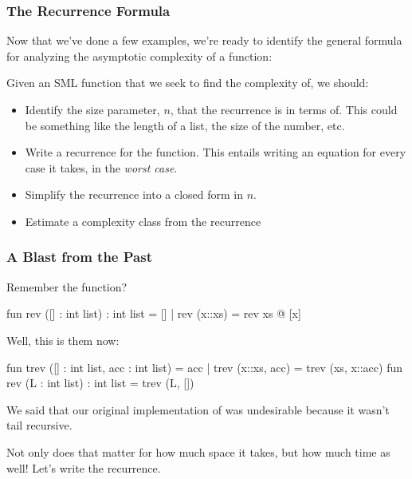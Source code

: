 \documentclass[aspectratio=169, handout]{beamer}
\begin{document}
\begin{frame}[fragile]
  \frametitle{The Recurrence Formula}

  Now that we've done a few examples, we're ready to identify the general formula for 
  analyzing the asymptotic complexity of a function:

  \pause
  \vspace{\fill}

  Given an SML function  that we seek to find the complexity of, we should:

  \pause
  \begin{itemize}
    \item Identify the size parameter, $n$, that the recurrence is in terms of. This could be something like
    the length of a list, the size of the number, etc. \pause
    \item Write a recurrence for the function. This entails writing an equation for every case it takes, in the
    \textit{worst case}. \pause 
    \item Simplify the recurrence into a closed form in $n$. \pause 
    \item Estimate a complexity class from the recurrence
  \end{itemize}
\end{frame}

\begin{frame}[fragile]
  \frametitle{A Blast from the Past}

  Remember the  function?

  \vspace{\fill}

  \begin{codeblock}
    fun rev ([] : int list) : int list = []
      | rev (x::xs) = rev xs @ [x]
  \end{codeblock}

  \pause
  Well, this is them now:\footnotemark

  \pause
  \begin{codeblock}
    fun trev ([] : int list, acc : int list) = acc
      | trev (x::xs, acc) = trev (xs, x::acc)
    fun rev (L : int list) : int list = trev (L, [])
  \end{codeblock}

  \pause
  We said that our original implementation of  was undesirable because it wasn't tail recursive.

  \pause
  \vspace{\fill}

  Not only does that matter for how much space it takes, but how much time as well! Let's write the recurrence.

\end{frame}
\end{document}
